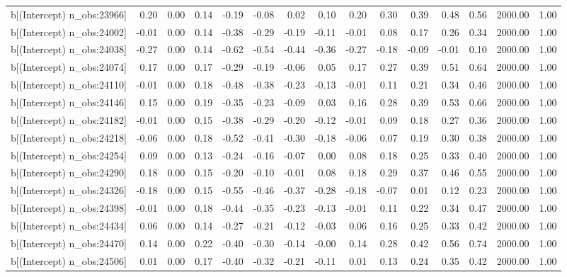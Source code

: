 \begin{table}[ht]
\begin{tabular}{rrrrrrrrrrrrrrr}
  b[(Intercept) n\_obs:23966] & 0.20 & 0.00 & 0.14 & -0.19 & -0.08 & 0.02 & 0.10 & 0.20 & 0.30 & 0.39 & 0.48 & 0.56 & 2000.00 & 1.00 \\ 
  b[(Intercept) n\_obs:24002] & -0.01 & 0.00 & 0.14 & -0.38 & -0.29 & -0.19 & -0.11 & -0.01 & 0.08 & 0.17 & 0.26 & 0.34 & 2000.00 & 1.00 \\ 
  b[(Intercept) n\_obs:24038] & -0.27 & 0.00 & 0.14 & -0.62 & -0.54 & -0.44 & -0.36 & -0.27 & -0.18 & -0.09 & -0.01 & 0.10 & 2000.00 & 1.00 \\ 
  b[(Intercept) n\_obs:24074] & 0.17 & 0.00 & 0.17 & -0.29 & -0.19 & -0.06 & 0.05 & 0.17 & 0.27 & 0.39 & 0.51 & 0.64 & 2000.00 & 1.00 \\ 
  b[(Intercept) n\_obs:24110] & -0.01 & 0.00 & 0.18 & -0.48 & -0.38 & -0.23 & -0.13 & -0.01 & 0.11 & 0.21 & 0.34 & 0.46 & 2000.00 & 1.00 \\ 
  b[(Intercept) n\_obs:24146] & 0.15 & 0.00 & 0.19 & -0.35 & -0.23 & -0.09 & 0.03 & 0.16 & 0.28 & 0.39 & 0.53 & 0.66 & 2000.00 & 1.00 \\ 
  b[(Intercept) n\_obs:24182] & -0.01 & 0.00 & 0.15 & -0.38 & -0.29 & -0.20 & -0.12 & -0.01 & 0.09 & 0.18 & 0.27 & 0.36 & 2000.00 & 1.00 \\ 
  b[(Intercept) n\_obs:24218] & -0.06 & 0.00 & 0.18 & -0.52 & -0.41 & -0.30 & -0.18 & -0.06 & 0.07 & 0.19 & 0.30 & 0.38 & 2000.00 & 1.00 \\ 
  b[(Intercept) n\_obs:24254] & 0.09 & 0.00 & 0.13 & -0.24 & -0.16 & -0.07 & 0.00 & 0.08 & 0.18 & 0.25 & 0.33 & 0.40 & 2000.00 & 1.00 \\ 
  b[(Intercept) n\_obs:24290] & 0.18 & 0.00 & 0.15 & -0.20 & -0.10 & -0.01 & 0.08 & 0.18 & 0.29 & 0.37 & 0.46 & 0.55 & 2000.00 & 1.00 \\ 
  b[(Intercept) n\_obs:24326] & -0.18 & 0.00 & 0.15 & -0.55 & -0.46 & -0.37 & -0.28 & -0.18 & -0.07 & 0.01 & 0.12 & 0.23 & 2000.00 & 1.00 \\ 
  b[(Intercept) n\_obs:24398] & -0.01 & 0.00 & 0.18 & -0.44 & -0.35 & -0.23 & -0.13 & -0.01 & 0.11 & 0.22 & 0.34 & 0.47 & 2000.00 & 1.00 \\ 
  b[(Intercept) n\_obs:24434] & 0.06 & 0.00 & 0.14 & -0.27 & -0.21 & -0.12 & -0.03 & 0.06 & 0.16 & 0.25 & 0.33 & 0.42 & 2000.00 & 1.00 \\ 
  b[(Intercept) n\_obs:24470] & 0.14 & 0.00 & 0.22 & -0.40 & -0.30 & -0.14 & -0.00 & 0.14 & 0.28 & 0.42 & 0.56 & 0.74 & 2000.00 & 1.00 \\ 
  b[(Intercept) n\_obs:24506] & 0.01 & 0.00 & 0.17 & -0.40 & -0.32 & -0.21 & -0.11 & 0.01 & 0.13 & 0.24 & 0.35 & 0.42 & 2000.00 & 1.00 \\ 

\end{tabular}
\end{table}
